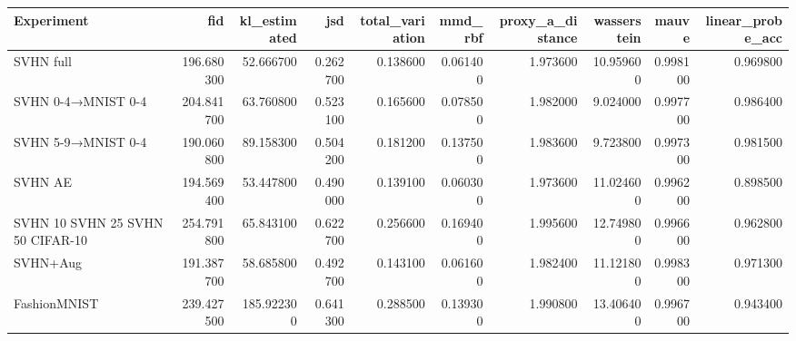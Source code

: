 \begin{tabular}{lrrrrrrrrr}
\toprule
Experiment & fid & kl_estimated & jsd & total_variation & mmd_rbf & proxy_a_distance & wasserstein & mauve & linear_probe_acc \\
\midrule
SVHN full & 196.680300 & 52.666700 & 0.262700 & 0.138600 & 0.061400 & 1.973600 & 10.959600 & 0.998100 & 0.969800 \\
SVHN {0-4}→MNIST {0-4} & 204.841700 & 63.760800 & 0.523100 & 0.165600 & 0.078500 & 1.982000 & 9.024000 & 0.997700 & 0.986400 \\
SVHN {5-9}→MNIST {0-4} & 190.060800 & 89.158300 & 0.504200 & 0.181200 & 0.137500 & 1.983600 & 9.723800 & 0.997300 & 0.981500 \\
SVHN AE & 194.569400 & 53.447800 & 0.490000 & 0.139100 & 0.060300 & 1.973600 & 11.024600 & 0.996200 & 0.898500 \\
SVHN 10%
SVHN 25%
SVHN 50%
CIFAR-10 & 254.791800 & 65.843100 & 0.622700 & 0.256600 & 0.169400 & 1.995600 & 12.749800 & 0.996600 & 0.962800 \\
SVHN+Aug & 191.387700 & 58.685800 & 0.492700 & 0.143100 & 0.061600 & 1.982400 & 11.121800 & 0.998300 & 0.971300 \\
FashionMNIST & 239.427500 & 185.922300 & 0.641300 & 0.288500 & 0.139300 & 1.990800 & 13.406400 & 0.996700 & 0.943400 \\
\bottomrule
\end{tabular}
